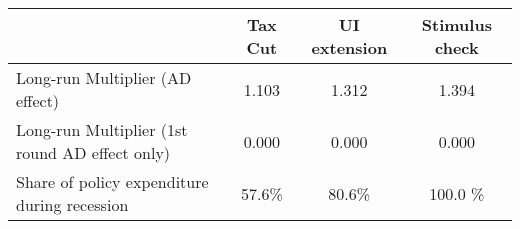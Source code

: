 \begin{tabular}{@{}lccc@{}}
\toprule
& Tax Cut    & UI extension    & Stimulus check    \\  \midrule
Long-run Multiplier (AD effect) &1.103  & 1.312  & 1.394     \\
Long-run Multiplier (1st round AD effect only) &0.000  & 0.000  & 0.000     \\
Share of policy expenditure during recession &57.6\%  & 80.6\%  & 100.0 \%    \\
\end{tabular}
